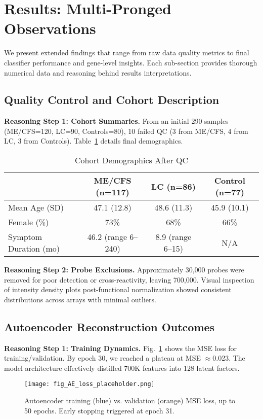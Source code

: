 \documentclass[journal]{IEEEtran}
\newcommand{\figref}[1]{Fig.~\ref{#1}}
\begin{document}
\section{Results: Multi-Pronged Observations}\label{sec:results}
We present extended findings that range from raw data quality metrics to final classifier performance and gene-level insights. Each sub-section provides thorough numerical data and reasoning behind results interpretations.

\subsection{Quality Control and Cohort Description}
\textbf{Reasoning Step 1: Cohort Summaries.}
From an initial 290 samples (ME/CFS=120, LC=90, Controls=80), 10 failed QC (3 from ME/CFS, 4 from LC, 3 from Controls). Table~\ref{tab:cohortdetails} details final demographics.

\begin{table}[H]
\centering
\caption{Cohort Demographics After QC}
\label{tab:cohortdetails}
\begin{tabular}{lccc}
\toprule
              & \textbf{ME/CFS (n=117)} & \textbf{LC (n=86)} & \textbf{Control (n=77)} \\
\midrule
Mean Age (SD) & 47.1 (12.8) & 48.6 (11.3) & 45.9 (10.1) \\
Female (\%)   & 73\% & 68\% & 66\%  \\
Symptom Duration (mo) & 46.2 (range 6--240) & 8.9 (range 6--15) & N/A \\
\bottomrule
\end{tabular}
\end{table}

\textbf{Reasoning Step 2: Probe Exclusions.}
Approximately 30,000 probes were removed for poor detection or cross-reactivity, leaving 700,000. Visual inspection of intensity density plots post-functional normalization showed consistent distributions across arrays with minimal outliers.

\subsection{Autoencoder Reconstruction Outcomes}
\textbf{Reasoning Step 1: Training Dynamics.}
\figref{fig:aeloss} shows the MSE loss for training/validation. By epoch 30, we reached a plateau at MSE $\approx$0.023. The model architecture effectively distilled 700K features into 128 latent factors.

\begin{figure}[H]
\centering
\texttt{[image: fig\_AE\_loss\_placeholder.png]}
\caption{Autoencoder training (blue) vs. validation (orange) MSE loss, up to 50 epochs. Early stopping triggered at epoch 31.}
\label{fig:aeloss}
\end{figure}
\end{document}
